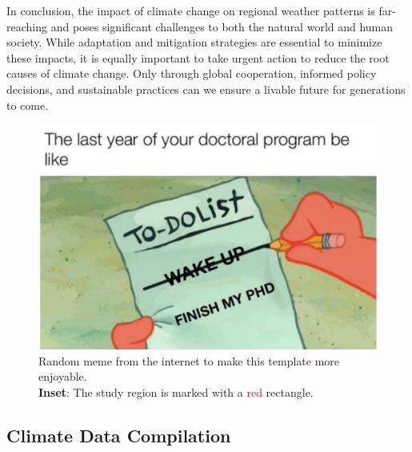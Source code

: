 In conclusion, the impact of climate change on regional weather patterns is far-reaching and poses significant challenges to both the natural world and human society. While adaptation and mitigation strategies are essential to minimize these impacts, it is equally important to take urgent action to reduce the root causes of climate change. Only through global cooperation, informed policy decisions, and sustainable practices can we ensure a livable future for generations to come.

\begin{figure}
    \centering
    \includegraphics[width=1\linewidth]{Figures/C2/fig_2_1.jpg}
     \caption{Random meme from the internet to make this template more enjoyable.\\  
    \textbf{Inset}: The study region is marked with a \textcolor{red}{red} rectangle.}
    \label{fig: 1.1}
\end{figure}

\pagebreak
\begin{landscape} %

\end{landscape}


\subsection{Climate Data Compilation}

